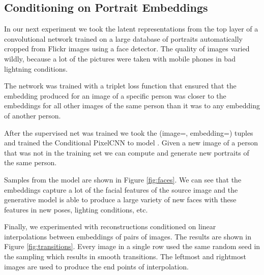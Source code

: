 \documentclass{article}
\begin{document}
\subsection{Conditioning on Portrait Embeddings}
\label{portraits}

In our next experiment we took the latent representations from the top layer of a convolutional network trained on a large database of portraits automatically cropped from Flickr images using a face detector.
The quality of images varied wildly, because a lot of the pictures were taken with mobile phones in bad lightning conditions. 

The network was trained with a triplet loss function \cite{schroff2015facenet} that ensured that the embedding  produced for an image  of a specific person was closer to the embeddings for all other images of the same person than it was to any embedding of another person.

After the supervised net was trained we took the (image=, embedding=) tuples and trained the Conditional PixelCNN to model . Given a new image of a person that was not in the training set we can compute  and generate new portraits of the same person. 

Samples from the model are shown in Figure \ref{fig:faces}. We can see that the embeddings capture a lot of the facial features of the source image and the generative model is able to produce a large variety of new faces with these features in new poses, lighting conditions, etc.

Finally, we experimented with reconstructions conditioned on linear interpolations between embeddings of pairs of images. The results are shown in Figure \ref{fig:transitions}. Every image in a single row used the same random seed in the sampling which results in smooth transitions. The leftmost and rightmost images are used to produce the end points of interpolation.
\end{document}
